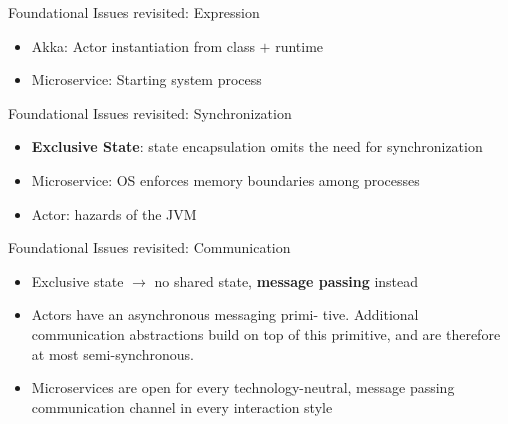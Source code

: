 \documentclass{beamer}
\begin{document}

\begin{frame}{Foundational Issues revisited: Expression}

\begin{itemize}
  \item Akka: Actor instantiation from class $+$ runtime
  \item Microservice: Starting system process
\end{itemize}

\end{frame}


\begin{frame}{Foundational Issues revisited: Synchronization}

\begin{itemize}
  \item \textbf{Exclusive State}: state encapsulation omits the need for synchronization
  \item Microservice: OS enforces memory boundaries among processes
  \item Actor: hazards of the JVM
\end{itemize}

\end{frame}


\begin{frame}{Foundational Issues revisited: Communication}

\begin{itemize}
  \item Exclusive state $\rightarrow$ no shared state, \textbf{message passing} instead 
  \item Actors have an asynchronous messaging primi- tive. Additional communication abstractions build on top of this primitive, and are therefore at most semi-synchronous.
  \item Microservices are open for every technology-neutral, message passing communication channel in every interaction style
\end{itemize}

\end{frame}

\end{document}
